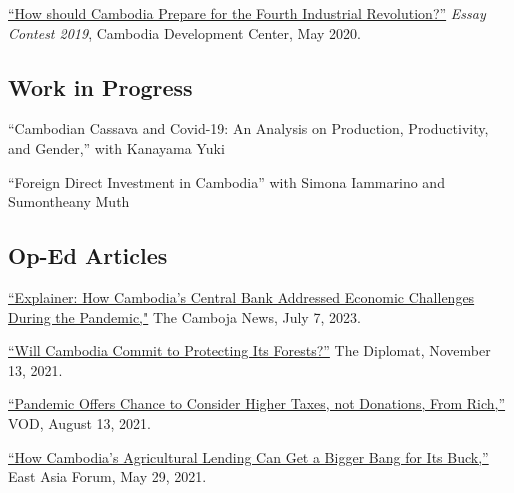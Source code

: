 \documentclass[10pt,a4paper]{article}
\begin{document}
		\href{https://cd-center.org/en/essay-contest-2019-first-place-winner/}{``How should Cambodia Prepare for the Fourth Industrial Revolution?''} \textit{Essay Contest 2019}, Cambodia Development Center, May 2020.

\subsection*{Work in Progress}
	
	``Cambodian Cassava and Covid-19: An Analysis on Production, Productivity, and Gender,'' with Kanayama Yuki
	
	``Foreign Direct Investment in Cambodia'' with Simona Iammarino and Sumontheany Muth

\subsection*{Op-Ed Articles}
	
	\href{https://cambojanews.com/explainer-how-cambodias-central-bank-addressed-economic-challenges-during-the-pandemic/}{``Explainer: How Cambodia’s Central Bank Addressed Economic Challenges During the Pandemic,"} The Camboja News, July 7, 2023. \\ \vspace{-.5em}
	
	\href{https://thediplomat.com/2021/11/will-cambodia-commit-to-protecting-its-forests/}{``Will Cambodia Commit to Protecting Its Forests?''} The Diplomat, November 13, 2021.\\ \vspace{-.5em}

	\href{https://vodenglish.news/opinion-pandemic-offers-chance-to-consider-higher-taxes-not-donations-from-rich/}{``Pandemic Offers Chance to Consider Higher Taxes, not Donations, From Rich,''} VOD, August 13, 2021.\\ \vspace{-.5em}

	\href{https://www.eastasiaforum.org/2021/05/29/how-cambodias-agricultural-lending-can-get-a-bigger-bang-for-its-buck/}{``How Cambodia's Agricultural Lending Can Get a Bigger Bang for Its Buck,''} East Asia Forum, May 29, 2021.\\ \vspace{-.5em}
\end{document}
